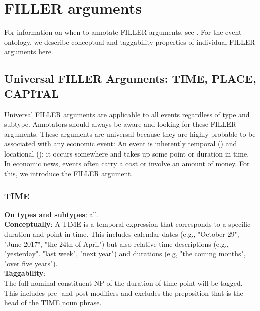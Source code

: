 \vspace{0.5cm}

\section{FILLER arguments} \label{sec:FILLERtypes}

\justify
For information on when to annotate FILLER arguments, see .
For the event ontology, we describe conceptual and taggability properties of individual FILLER arguments here.

\subsection{Universal FILLER Arguments: TIME, PLACE, CAPITAL}

\justify
Universal FILLER arguments are applicable to all events regardless of type and subtype.
Annotators should always be aware and looking for these FILLER arguments.
These arguments are universal because they are highly probable to be associated with any economic event:
An event is inherently temporal () and locational (): it occurs somewhere and takes up some point or duration in time.
In economic news, events often carry a cost or involve an amount of money. For this, we introduce the  FILLER argument.

\subsubsection{TIME}

\justify
\noindent\textbf{On types and subtypes}: all.\\[6pt]
\noindent\textbf{Conceptually}:
A TIME is a temporal expression that corresponds to a specific duration and point in time.
This includes calendar dates (e.g., "October 29", "June 2017", "the 24th of April") but also relative time descriptions (e.g., "yesterday". "last week", "next year") and durations (e.g, "the coming months", "over five years").\\

\noindent\textbf{Taggability}:\\
The full nominal constituent NP of the duration of time point will be tagged.
This includes pre- and post-modifiers and excludes the preposition that is the head of the TIME noun phrase.

\begin{exe}
    \ex {}
    \ex {}
    \ex {}
    \ex {}
    \ex {}
    \ex {}
\end{exe}

